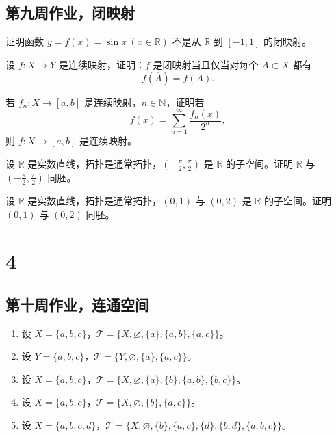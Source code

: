\section{第九周作业，闭映射}

\begin{homework}[13]
证明函数 $y = f(x) = \sin x \ (x \in \mathbb{R})$ 不是从 $\mathbb{R}$ 到 $[-1,1]$ 的闭映射。
\end{homework}

\begin{homework}[3.6]
设 $f : X \to Y$ 是连续映射，证明：$f$ 是闭映射当且仅当对每个 $A \subset X$ 都有
\[
f(\overline{A}) = \overline{f(A)}.
\]
\end{homework}

\begin{homework}[3.3]
若 $f_n : X \to [a,b]$ 是连续映射，$n \in \mathbb{N}$，证明若
\[
f(x) = \sum_{n=1}^{\infty} \frac{f_n(x)}{2^n},
\]
则 $f : X \to [a,b]$ 是连续映射。
\end{homework}

\begin{homework}[10] 
设 $\mathbb{R}$ 是实数直线，拓扑是通常拓扑，$(-\frac{\pi}{2}, \frac{\pi}{2})$ 是 $\mathbb{R}$ 的子空间。证明 $\mathbb{R}$ 与 $ \left( -\frac{\pi}{2}, \frac{\pi}{2} \right)$ 同胚。
\end{homework}

\begin{homework}[11]
设 $\mathbb{R}$ 是实数直线，拓扑是通常拓扑，$(0,1)$ 与 $(0,2)$ 是 $\mathbb{R}$ 的子空间。证明 $(0,1)$ 与 $(0,2)$ 同胚。
\end{homework}
\chapter{4}
\section{第十周作业，连通空间}

\begin{homework}[1]
\begin{enumerate}
  \item 设 $X=\{a,b,c\}$，$\mathcal{T}=\{X,\varnothing,\{a\},\{a,b\},\{a,c\}\}$。
  \item 设 $Y=\{a,b,c\}$，$\mathcal{T}=\{Y,\varnothing,\{a\},\{a,c\}\}$。
  \item 设 $X=\{a,b,c\}$，$\mathcal{T}=\{X,\varnothing,\{a\},\{b\},\{a,b\},\{b,c\}\}$。
  \item 设 $X=\{a,b,c\}$，$\mathcal{T}=\{X,\varnothing,\{b\},\{a,c\}\}$。
  \item 设 $X=\{a,b,c,d\}$，$\mathcal{T}=\{X,\varnothing,\{b\},\{a,c\},\{d\},\{b,d\},\{a,b,c\}\}$。
\end{enumerate}
\end{homework}

